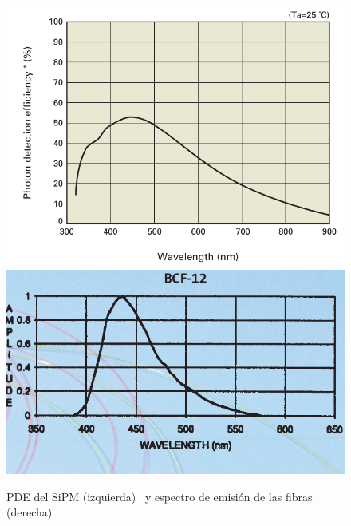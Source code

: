 \begin{figure}[htb]
\centering
{
\includegraphics[scale=0.3]{PED.png} 
}
{
\includegraphics[scale=0.35]{EmisionBCF12.png} 
}
\label{8}
\caption{PDE del SiPM (izquierda)~\cite{datasheet SiPM} y espectro de emisión de las fibras (derecha)~\cite{datasheet} \label{Espectros}}
\end{figure}

